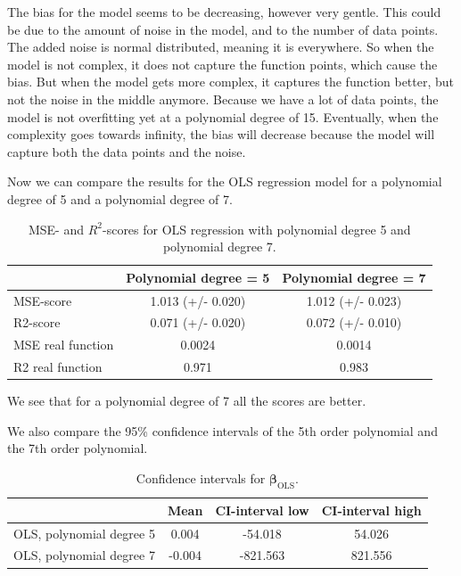 \documentclass[12pt]{extarticle}
\begin{document}
The bias for the model seems to be decreasing, however very gentle. This could be due to the amount of noise in the model, and to the number of data points. The added noise is normal distributed, meaning it is everywhere. So when the model is not complex, it does not capture the function points, which cause the bias. But when the model gets more complex, it captures the function better, but not the noise in the middle anymore. Because we have a lot of data points, the model is not overfitting yet at a polynomial degree of 15. Eventually, when the complexity goes towards infinity, the bias will decrease because the model will capture both the data points and the noise.

Now we can compare the results for the OLS regression model for a polynomial degree of 5 and a polynomial degree of 7.

\begin{table}
  \begin{center}
    \caption{MSE- and $R^2$-scores for OLS regression with polynomial degree 5 and polynomial degree 7.}
    \label{tab:table4}
    \begin{tabular}{l|c|c} 
      \textbf{ } & \textbf{Polynomial degree = 5} & \textbf{Polynomial degree = 7}\\
      \hline
      MSE-score & 1.013 (+/- 0.020) & 1.012 (+/- 0.023)\\
      R2-score & 0.071 (+/- 0.020) & 0.072 (+/- 0.010)\\
      MSE real function & 0.0024 & 0.0014\\
    R2 real function & 0.971 & 0.983\\
    \end{tabular}
  \end{center}
\end{table}


We see that for a polynomial degree of 7 all the scores are better.

We also compare the 95\% confidence intervals of the 5th order polynomial and the 7th order polynomial.

\begin{table}
  \begin{center}
    \caption{Confidence intervals for $\bm{\beta}_{\text{OLS}}$.}
    \label{tab:table5}
    \begin{tabular}{l|c|c|c} 
      & \textbf{Mean} & \textbf{CI-interval low} & \textbf{CI-interval high}\\
      \hline
    OLS, polynomial degree 5 & 0.004 & -54.018 & 54.026\\
    OLS, polynomial degree 7 & -0.004 & -821.563 & 821.556\\
    \end{tabular}
  \end{center}
\end{table}
\end{document}
